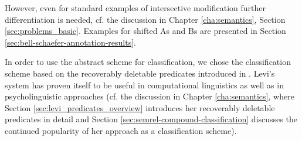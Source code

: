 \nocite{Kamp:1975} 
However, even for standard examples of intersective modification further
differentiation is needed, cf. the discussion in Chapter
\ref{cha:semantics}, Section \ref{sec:problems_basic}.
Examples for shifted As and Bs are presented in Section \ref{sec:bell-schaefer-annotation-results}.


In order to use the abstract scheme for classification, 
we chose the classification scheme
based on the recoverably deletable predicates introduced in
\citet{Levi:1978}.
Levi's system has 
proven itself to be useful in computational linguistics as well as in psycholinguistic approaches
(cf. the discussion in Chapter
\ref{cha:semantics}, where Section \ref{sec:levi_predicates_overview} introduces her recoverably
deletable predicates in detail and Section
\ref{sec:semrel-compound-classification} discusses the continued
popularity of her approach as a classification scheme). 


